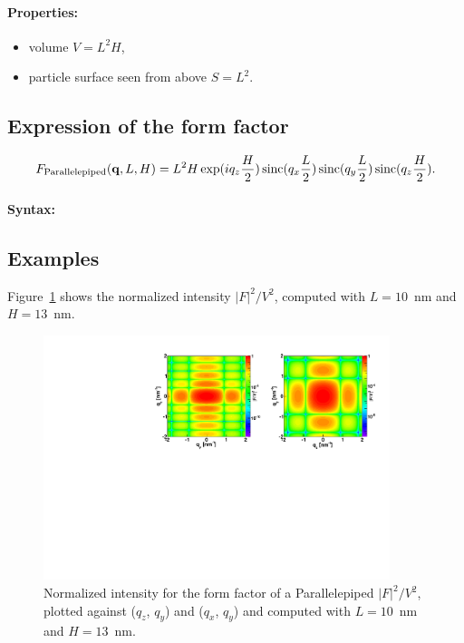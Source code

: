 \paragraph{Properties:}
\begin{itemize}
\item volume $V= L^2 H$,
\item particle surface seen from above $S =L^2$.
\end{itemize}

\subsection{Expression of the form factor}
\begin{equation*}
F_{\rm{Parallelepiped}}(\mathbf{q},L, H) = L^2 H\exp(i q_z \frac{H}{2}) \operatorname{sinc}(q_x\frac{L}{2})
\operatorname{sinc}(q_y\frac{L}{2})\operatorname{sinc}(q_z \frac{H}{2}).
\end{equation*}

\paragraph{Syntax:} 

\subsection{Examples}
Figure~\ref{figFFparallelEx} shows the normalized intensity
$|F|^2/V^2$, computed with $L=10$~nm and $H=13$~nm.
\begin{figure}[h]
\begin{center}
\includegraphics[width=0.9\textwidth]{Figures/figffparallel}
\end{center}
\caption{Normalized intensity for the form factor of a Parallelepiped
  $|F|^2/V^2$, plotted against ($q_z$, $q_y$) and  ($q_x$, $q_y$) and computed with $L=10$~nm and $H=13$~nm.}
\label{figFFparallelEx}
\end{figure}

